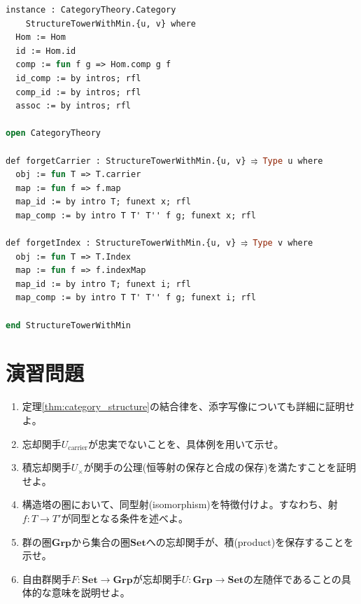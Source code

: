 \documentclass[a4paper,12pt]{article}
\theoremstyle{definition}
\begin{document}
\begin{lstlisting}[style=leanstyle, language=ML]
instance : CategoryTheory.Category 
    StructureTowerWithMin.{u, v} where
  Hom := Hom
  id := Hom.id
  comp := fun f g => Hom.comp g f
  id_comp := by intros; rfl
  comp_id := by intros; rfl
  assoc := by intros; rfl

open CategoryTheory

def forgetCarrier : StructureTowerWithMin.{u, v} ⥤ Type u where
  obj := fun T => T.carrier
  map := fun f => f.map
  map_id := by intro T; funext x; rfl
  map_comp := by intro T T' T'' f g; funext x; rfl

def forgetIndex : StructureTowerWithMin.{u, v} ⥤ Type v where
  obj := fun T => T.Index
  map := fun f => f.indexMap
  map_id := by intro T; funext i; rfl
  map_comp := by intro T T' T'' f g; funext i; rfl

end StructureTowerWithMin
\end{lstlisting}

\section{演習問題}

\begin{enumerate}
\item 定理\ref{thm:category_structure}の結合律を、添字写像についても詳細に証明せよ。

\item 忘却関手$U_{\text{carrier}}$が忠実でないことを、具体例を用いて示せ。

\item 積忘却関手$U_{\times}$が関手の公理(恒等射の保存と合成の保存)を満たすことを証明せよ。

\item 構造塔の圏において、同型射(isomorphism)を特徴付けよ。すなわち、射$f : T \to T'$が同型となる条件を述べよ。

\item 群の圏$\mathbf{Grp}$から集合の圏$\mathbf{Set}$への忘却関手が、積(product)を保存することを示せ。

\item 自由群関手$F : \mathbf{Set} \to \mathbf{Grp}$が忘却関手$U : \mathbf{Grp} \to \mathbf{Set}$の左随伴であることの具体的な意味を説明せよ。
\end{enumerate}
\end{document}
